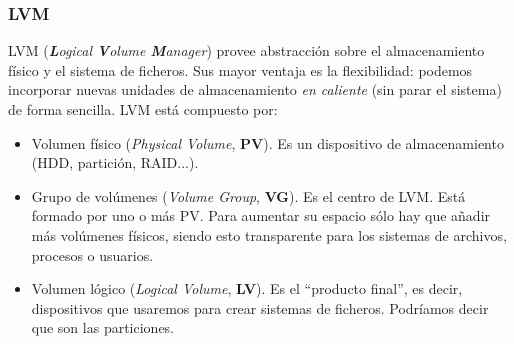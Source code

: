 \documentclass[12pt,spanish]{article}
\begin{document}
\newpage

\subsubsection{LVM}
LVM (\textit{\textbf{L}ogical \textbf{V}olume \textbf{M}anager}) provee abstracción sobre el almacenamiento físico y el sistema de ficheros. Sus mayor ventaja es la flexibilidad: podemos incorporar nuevas unidades de almacenamiento \textit{en caliente} (sin parar el sistema) de forma sencilla. LVM está compuesto por:
\begin{itemize}
  \item Volumen físico (\textit{Physical Volume}, \textbf{PV}). Es un dispositivo de almacenamiento (HDD, partición, RAID...).
  \item Grupo de volúmenes (\textit{Volume Group}, \textbf{VG}). Es el centro de LVM. Está formado por uno o más PV. Para aumentar su espacio sólo hay que añadir más volúmenes físicos, siendo esto transparente para los sistemas de archivos, procesos o usuarios.
  \item Volumen lógico (\textit{Logical Volume}, \textbf{LV}). Es el ``producto final'', es decir, dispositivos que usaremos para crear sistemas de ficheros. Podríamos decir que son las particiones.
\end{itemize}
\end{document}
